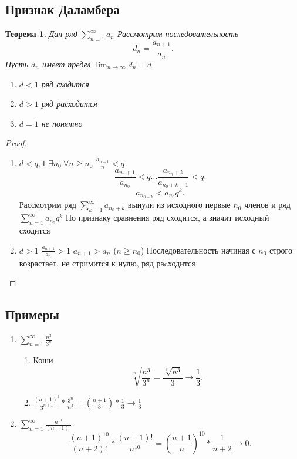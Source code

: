 \documentclass{scrartcl}
\newtheorem{theorem}{Теорема}
\begin{document}
\subsection{Признак Даламбера}
\begin{theorem}
    Дан ряд $\sum_{n=1}^{\infty} a_{n}$ 
    Рассмотрим последовательность
    \[
    d_{n} = \frac{a_{n + 1}}{a_{n}}
    .\] 
    Пусть $d_{n}$ имеет предел $\lim_{n \to \infty} d_{n} = d$ 
    \begin{enumerate}
        \item $d < 1$ ряд сходится
        \item  $d > 1$ ряд расходится
        \item  $d = 1$ не понятно
    \end{enumerate}
\end{theorem}
\begin{proof}
    \begin{enumerate}
        \item $d < q , 1$  $\exists  n_0  ~ \forall  n \ge  n_0$ $\frac{a_{n + 1}}{n} < q$ 
            \[
            \frac{a_{n_0 + 1}}{a_{n_0}} < q\dots \frac{a_{n_0 + k}}{a_{n_0 + k -1}} < q
            .\] 
            \[
                a_{n_{0 + k}} < a_{n_0} q^{k}
            .\] 
            Рассмотрим ряд $\sum_{k=1}^{\infty} a_{n_0 + k}$ вынули из исходного первые $n_0$ членов и ряд $\sum_{n=1}^{\infty} a_{n_0}q^{k}$ 
            По признаку сравнения ряд сходится, а значит исходный сходится
        \item
            $d > 1$  $\frac{a_{n + 1}}{a_{n}} > 1$ $a_{n + 1} > a_{n}$ ($n \ge  n_0$)
            Последовательность начиная с $n_0$ строго возрастает, не стримится к нулю, ряд раcходится
    \end{enumerate}
\end{proof}
\subsection{Примеры}
\begin{enumerate}
    \item $\sum_{n=1}^{\infty} \frac{n^3}{3^{n}}$ 
        \begin{enumerate}
            \item Коши
                \[
                    \sqrt[n]{\frac{n^{3}}{3^{n}}}  = \frac{\sqrt[3]{n^{3}} }{3} \to \frac{1}{3}
                .\] 
            \item $\frac{(n + 1)^{3}}{3^{n+1}} * \frac{3^{n}}{n^{3}} = (\frac{n + 1}{3}) * \frac{1}{3} \to \frac{1}{3}$
        \end{enumerate}
    \item $\sum_{n=1}^{\infty} \frac{n^{10}}{(n + 1)!}$ 
        \[
        \frac{(n + 1)^{10}}{(n + 2)!} * \frac{(n + 1)!}{n^{10}} =
        (\frac{n + 1}{n})^{10} * \frac{1}{n + 2} \to 0 
        .\] 
\end{enumerate}
\end{document}
